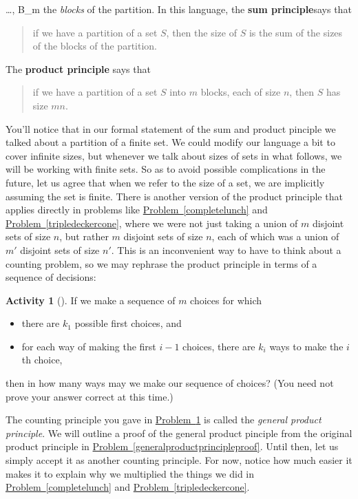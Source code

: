 \documentclass[10pt,]{book}
\newcommand{\terminology}[1]{\textbf{#1}}
\theoremstyle{plain}
\theoremstyle{definition}
\newtheorem{activity}[project]{Activity}
\numberwithin{equation}{chapter}
\begin{document}
\ldots, B_m\) the \emph{blocks} of the partition. In this language, the \terminology{sum principle}says that%
\begin{quote}if we have a partition of a set \(S\), then the size of \(S\) is the sum of the sizes of the blocks of the partition.%
\end{quote}
The \terminology{product principle} says that%
\begin{quote}if we have a partition of a set \(S\) into \(m\) blocks, each of size \(n\), then \(S\) has size \(mn\).%
\end{quote}
You'll notice that in our formal statement of the sum and product pinciple we talked about a partition of a finite set. We could modify our language a bit to cover infinite sizes, but whenever we talk about sizes of sets in what follows, we will be working with finite sets. So as to avoid possible complications in the future, let us agree that when we refer to the size of a set, we are implicitly assuming the set is finite. There is another version of the product principle that applies directly in problems like \hyperref[completelunch]{Problem~\ref{completelunch}} and \hyperref[tripledeckercone]{Problem~\ref{tripledeckercone}}, where we were not just taking a union of \(m\) disjoint sets of size \(n\), but rather \(m\) disjoint sets of size \(n\), each of which was a union of \(m'\) disjoint sets of size \(n'\). This is an inconvenient way to have to think about a counting problem, so we may rephrase the product principle in terms of a sequence of decisions:%
\begin{activity}[]\label{generalproductprincipleintro}
If we make a sequence of \(m\) choices for which \leavevmode%
\begin{itemize}[label=\textbullet]
\item{}there are \(k_1\) possible first choices, and%
\item{}for each way of making the first \(i-1\) choices, there are \(k_i\) ways to make the \(i\)th choice,%
\end{itemize}
 then in how many ways may we make our sequence of choices? (You need not prove your answer correct at this time.)%
\end{activity}
The counting principle you gave in \hyperref[generalproductprincipleintro]{Problem~\ref{generalproductprincipleintro}} is called the \emph{general product principle}. We will outline a proof of the general product pinciple from the original product principle in \hyperref[generalproductprincipleproof]{Problem~\ref{generalproductprincipleproof}}. Until then, let us simply accept it as another counting principle. For now, notice how much easier it makes it to explain why we multiplied the things we did in \hyperref[completelunch]{Problem~\ref{completelunch}} and \hyperref[tripledeckercone]{Problem~\ref{tripledeckercone}}.%
\end{document}
